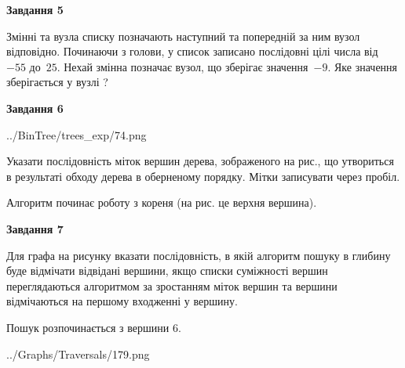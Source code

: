 \documentclass[12pt, ukrainian]{article}
\begin{document}
{\begin {large}
{\begin {center}\textbf{Завдання 5}\end {center}}\par
Змінні  та  вузла списку позначають наступний та попередній за ним вузол відповідно. Починаючи з голови, у список записано послідовні цілі числа від~$-55$ до~$25$. Нехай змінна  позначає вузол, що зберігає значення~$-9$.
Яке значення зберігається у вузлі  ?\par
\newpage

{\begin {center}\textbf{Завдання 6}\end {center}}\par

\begin{center}
	{../BinTree/trees_exp/74.png}
\end{center}
Указати послідовність міток вершин дерева, зображеного на рис., що утвориться в результаті обходу дерева в оберненому порядку. Мітки записувати через пробіл.\par Алгоритм починає роботу з кореня (на рис. це верхня вершина).\par
\newpage

{\begin {center}\textbf{Завдання 7}\end {center}}\par
Для графа на рисунку вказати послідовність, в якій алгоритм пошуку в глибину буде відмічати відвідані вершини, якщо списки суміжності вершин переглядаються алгоритмом за зростанням міток вершин та вершини відмічаються на першому вход\-женні у вершину.\par
Пошук розпочинається з вершини 6.\par

\begin{center}
	{../Graphs/Traversals/179.png}
\end{center}\par
\newpage


\end{large}}
\end{document}
